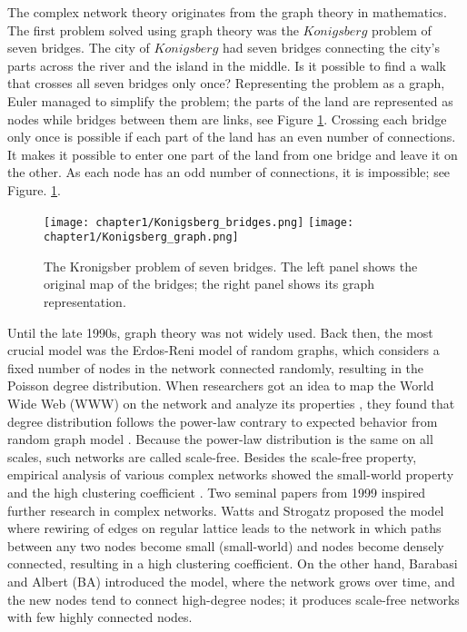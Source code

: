 The complex network theory originates from the graph theory in mathematics. The first problem solved using graph theory was the $Konigsberg$ problem of seven bridges. The city of $Konigsberg$ had seven bridges connecting the city's parts across the river and the island in the middle. Is it possible to find a walk that crosses all seven bridges only once? Representing the problem as a graph, Euler managed to simplify the problem; the parts of the land are represented as nodes while bridges between them are links, see Figure \ref{fig:Krgraph}. Crossing each bridge only once is possible if each part of the land has an even number of connections. It makes it possible to enter one part of the land from one bridge and leave it on the other. As each node has an odd number of connections, it is impossible; see Figure. \ref{fig:Krgraph}.

\begin{figure}[!ht]
	\centering
	\texttt{[image: chapter1/Konigsberg\_bridges.png]} \hspace{2cm}
	\texttt{[image: chapter1/Konigsberg\_graph.png]}
	\caption[Konigsberg problem of seven bridges.]{The Kronigsber problem of seven bridges. The left panel shows the original map of the bridges; the right panel shows its graph representation. }
	
	\label{fig:Krgraph}
\end{figure}

Until the late 1990s, graph theory was not widely used. Back then, the most crucial model was the Erdos-Reni model of random graphs, which considers a fixed number of nodes in the network connected randomly, resulting in the Poisson degree distribution. When researchers got an idea to map the World Wide Web (WWW) on the network and analyze its properties \cite{huberman1999}, they found that degree distribution follows the power-law contrary to expected behavior from random graph model \cite{dorogovtsev2010complex}. Because the power-law distribution is the same on all scales, such networks are called scale-free. Besides the scale-free property, empirical analysis of various complex networks showed the small-world property and the high clustering coefficient \cite{barabasi2009,newman2010}. Two seminal papers from 1999 inspired further research in complex networks. Watts and Strogatz \cite{watts1998collective} proposed the model where rewiring of edges on regular lattice leads to the network in which paths between any two nodes become small (small-world) and nodes become densely connected, resulting in a high clustering coefficient. On the other hand, Barabasi and Albert (BA) \cite{barabasi1999} introduced the model, where the network grows over time, and the new nodes tend to connect high-degree nodes; it produces scale-free networks with few highly connected nodes. 

